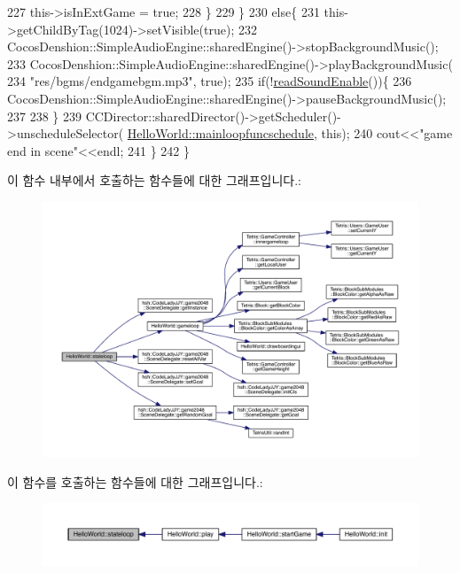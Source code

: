 \begin{DoxyCode}
227             this->isInExtGame = \textcolor{keyword}{true};
228         \}
229     \}
230     \textcolor{keywordflow}{else}\{
231         this->getChildByTag(1024)->setVisible(\textcolor{keyword}{true});
232         CocosDenshion::SimpleAudioEngine::sharedEngine()->stopBackgroundMusic();
233         CocosDenshion::SimpleAudioEngine::sharedEngine()->playBackgroundMusic(
234                                                                               \textcolor{stringliteral}{"res/bgms/endgamebgm.mp3"}, \textcolor{keyword}{
      true});
235         \textcolor{keywordflow}{if}(!\hyperlink{class_hello_world_a0f8c9d1b95e03b397e680b9dafb8f3d9}{readSoundEnable}())\{
236             CocosDenshion::SimpleAudioEngine::sharedEngine()->pauseBackgroundMusic();
237             
238         \}
239         CCDirector::sharedDirector()->getScheduler()->unscheduleSelector(
      \hyperlink{class_hello_world_a01e6475e24156e4f8b396c8e726f6260}{HelloWorld::mainloopfuncschedule}, \textcolor{keyword}{this});
240         cout<<\textcolor{stringliteral}{"game end in scene"}<<endl;
241     \}
242 \}
\end{DoxyCode}
이 함수 내부에서 호출하는 함수들에 대한 그래프입니다.\+:
\nopagebreak
\begin{figure}[H]
\begin{center}
\leavevmode
\includegraphics[width=350pt]{d9/d98/class_hello_world_a4ab71b15b7e362af143d2a539e39a538_cgraph}
\end{center}
\end{figure}
이 함수를 호출하는 함수들에 대한 그래프입니다.\+:
\nopagebreak
\begin{figure}[H]
\begin{center}
\leavevmode
\includegraphics[width=350pt]{d9/d98/class_hello_world_a4ab71b15b7e362af143d2a539e39a538_icgraph}
\end{center}
\end{figure}


